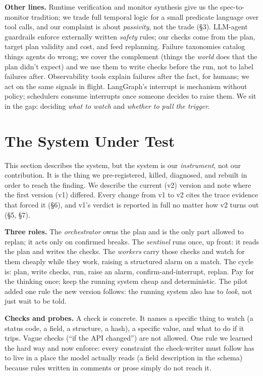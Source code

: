 \documentclass[acmsmall,screen]{acmart}
\begin{document}
\textbf{Other lines.} Runtime verification and monitor synthesis \cite{ref4,
ref5} give us the spec-to-monitor tradition; we trade full temporal logic for a
small predicate language over tool calls, and our complaint is about
\emph{passivity}, not the trade (\S3). LLM-agent guardrails \cite{ref9, ref10,
ref11, ref12, ref13} enforce externally written \emph{safety} rules; our checks
come from the plan, target plan validity and cost, and feed replanning. Failure
taxonomies \cite{ref14, ref20} catalog things agents do wrong; we cover the
complement (things the \emph{world} does that the plan didn't expect) and we
use them to write checks before the run, not to label failures after.
Observability tools \cite{ref15, ref16, ref17, ref18} explain failures after
the fact, for humans; we act on the same signals in flight. LangGraph's
interrupt \cite{ref22} is mechanism without policy; schedulers \cite{ref19}
consume interrupts once someone decides to raise them. We sit in the gap:
deciding \emph{what to watch} and \emph{whether to pull the trigger}.

\section{The System Under Test}
This section describes the system, but the system is our \emph{instrument}, not
our contribution. It is the thing we pre-registered, killed, diagnosed, and
rebuilt in order to reach the finding. We describe the current (v2) version and
note where the first version (v1) differed. Every change from v1 to v2 cites
the trace evidence that forced it (\S6), and v1's verdict is reported in full
no matter how v2 turns out (\S5, \S7).

\textbf{Three roles.} The \emph{orchestrator} owns the plan and is the only
part allowed to replan; it acts only on confirmed breaks. The \emph{sentinel}
runs once, up front: it reads the plan and writes the checks. The \emph{workers}
carry those checks and watch for them cheaply while they work, raising a
structured alarm on a match. The cycle is: plan, write checks, run, raise an
alarm, confirm-and-interrupt, replan. Pay for the thinking once; keep the
running system cheap and deterministic. The pilot added one rule the new
version follows: the running system also has to \emph{look}, not just wait to
be told.

\textbf{Checks and probes.} A check is concrete. It names a specific thing to
watch (a status code, a field, a structure, a hash), a specific value, and what
to do if it trips. Vague checks (``if the API changed'') are not allowed. One
rule we learned the hard way and now enforce: every constraint the check-writer
must follow has to live in a place the model actually reads (a field
description in the schema) because rules written in comments or prose simply do
not reach it.
\end{document}
